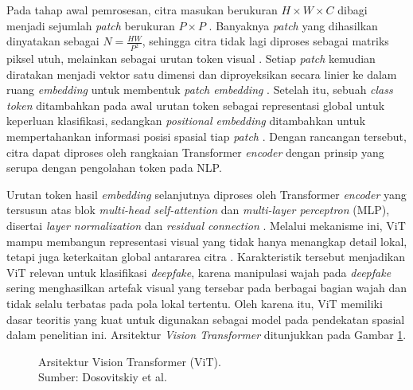 Pada tahap awal pemrosesan, citra masukan berukuran $H \times W \times C$ dibagi menjadi sejumlah \textit{patch} berukuran $P \times P$ \cite{dosovitskiy2021imageworth16x16words}. Banyaknya \textit{patch} yang dihasilkan dinyatakan sebagai $N = \frac{HW}{P^2}$, sehingga citra tidak lagi diproses sebagai matriks piksel utuh, melainkan sebagai urutan token visual \cite{dosovitskiy2021imageworth16x16words}. Setiap \textit{patch} kemudian diratakan menjadi vektor satu dimensi dan diproyeksikan secara linier ke dalam ruang \textit{embedding} untuk membentuk \textit{patch embedding} \cite{dosovitskiy2021imageworth16x16words}. Setelah itu, sebuah \textit{class token} ditambahkan pada awal urutan token sebagai representasi global untuk keperluan klasifikasi, sedangkan \textit{positional embedding} ditambahkan untuk mempertahankan informasi posisi spasial tiap \textit{patch} \cite{dosovitskiy2021imageworth16x16words}. Dengan rancangan tersebut, citra dapat diproses oleh rangkaian Transformer \textit{encoder} dengan prinsip yang serupa dengan pengolahan token pada NLP. \par

Urutan token hasil \textit{embedding} selanjutnya diproses oleh Transformer \textit{encoder} yang tersusun atas blok \textit{multi-head self-attention} dan \textit{multi-layer perceptron} (MLP), disertai \textit{layer normalization} dan \textit{residual connection} \cite{dosovitskiy2021imageworth16x16words}. Melalui mekanisme ini, ViT mampu membangun representasi visual yang tidak hanya menangkap detail lokal, tetapi juga keterkaitan global antararea citra \cite{dosovitskiy2021imageworth16x16words}. Karakteristik tersebut menjadikan ViT relevan untuk klasifikasi \textit{deepfake}, karena manipulasi wajah pada \textit{deepfake} sering menghasilkan artefak visual yang tersebar pada berbagai bagian wajah dan tidak selalu terbatas pada pola lokal tertentu. Oleh karena itu, ViT memiliki dasar teoritis yang kuat untuk digunakan sebagai model pada pendekatan spasial dalam penelitian ini\cite{wang2024timelysurveyvisiontransformer}. Arsitektur \textit{Vision Transformer} ditunjukkan pada Gambar \ref{fig:arsitektur-vit}. \par

\begin{figure}[htbp]
	\centering
	\caption{Arsitektur Vision Transformer (ViT).\\Sumber: Dosovitskiy et al. \cite{dosovitskiy2021imageworth16x16words}}
	\label{fig:arsitektur-vit}
\end{figure}

